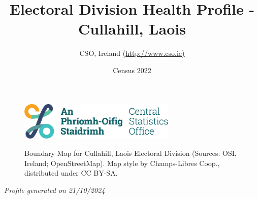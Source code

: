 \documentclass{article}
\title{Electoral Division Health Profile - Cullahill, Laois}
\date{Census 2022}
\author{CSO, Ireland  (\url{http://www.cso.ie)}}
\begin{document}


\begin{figure}
	\centering
\includegraphics[width =75mm]{../figures/CSO_Logo.png}
\end{figure}

\begin{figure}[h]
	\centering
	\setlength{\fboxsep}{1pt}
	\caption{\normalsize Boundary Map for Cullahill, Laois Electoral Division (Sources: OSI, Ireland; OpenStreetMap). Map style by Champs-Libres Coop., distributed under CC BY-SA.}
	\label{fig:2ae19629-1a6a-13a3-e055-000000000001}
	\end{figure}
	{\let\newpage\relax\maketitle}
	     \begin{center}
         \emph{Profile generated on 21/10/2024}
     \end{center}
\end{document}
